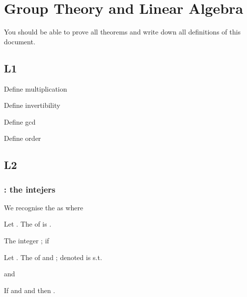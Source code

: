 \section{Group Theory and Linear Algebra}
You should be able to prove all theorems and write down all definitions of this document.
\subsection{L1}
\begin{compactitem}
\item Define multiplication
\item Define invertibility
\item Define gcd
\item Define order
\end{compactitem}

\subsection{L2} 
\subsubsection{: the intejers}
\begin{D} We recognise the  as  where  \end{D}

\begin{D}
Let . The  of  is . \end{D}

\begin{D} The integer   ;  if  \end{D}

\begin{D} Let . The  of  and ; denoted  is  s.t. 
\begin{compactitem}
\item {} and 
\item If  and  and  then .
\end{compactitem}
\end{D}

